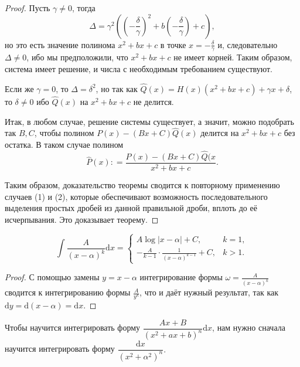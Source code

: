\begin{proof}
Пусть $\gamma \ne 0$, тогда
\[
 \Delta = \gamma^2 \left( \left( -\frac{\delta}{\gamma} \right)^2 + b \left(-\frac{\delta}{\gamma}\right) + c \right),
\]
но это есть значение полинома $x^2 + bx +c$ в точке $x = -\frac{\delta}{\gamma}$ и, следовательно $\Delta \ne 0$, ибо мы предположили, что $x^2 + bx +c$ не имеет корней. Таким образом, система имеет решение, и числа с необходимым требованием существуют. 

Если же $\gamma =0$, то $\Delta = \delta^2$, но так как $\widehat{Q}(x) = H(x)(x^2 + bx + c) + \gamma x + \delta$, то $\delta \ne 0$ ибо $\widehat{Q}(x)$ на $x^2 + bx +c$ не делится.

Итак, в любом случае, решение системы существует, а значит, можно подобрать так $B,C$, чтобы полином $P(x) - (Bx + C)\widehat{Q}(x)$ делится на $x^2 + bx + c$ без остатка. В таком случае полином
\[
 \widehat{P}(x): = \frac{P(x) - (Bx + C)\widehat{Q}(x}{x^2 + bx + c}.
\]

Таким образом, доказательство теоремы сводится к повторному применению случаев (1) и (2), которые обеспечивают возможность последовательного выделения простых дробей из данной правильной дроби, вплоть до её исчерпывания. Это доказывает теорему.
\end{proof}





\begin{lemma}\label{int_of_(x-a)^{-k}}
    \[
     \int \frac{A}{(x-\alpha)^k} \mathrm{d}x = \begin{cases}
         A \log|x-\alpha| + C, & k =1,\\
         - \frac{A}{k-1}\cdot \frac{1}{(x-\alpha)^{k-1}} + C, & k >1.
     \end{cases}
    \]
\end{lemma}
\begin{proof}
    С помощью замены $y =x-\alpha$ интегрирование формы $\omega = \frac{A}{(x-\alpha)^k}$ сводится к интегрированию формы $\frac{A}{y^k}$, что и даёт нужный результат, так как $\mathrm{d}y = \mathrm{d}(x-\alpha) = \mathrm{d}x.$
\end{proof}

Чтобы научится интегрировать форму $\dfrac{Ax + B}{(x^2 + ax + b)^n} \mathrm{d}x$, нам нужно сначала научится интегрировать форму $\dfrac{\mathrm{d}x}{(x^2 + \alpha^2)^n}.$

